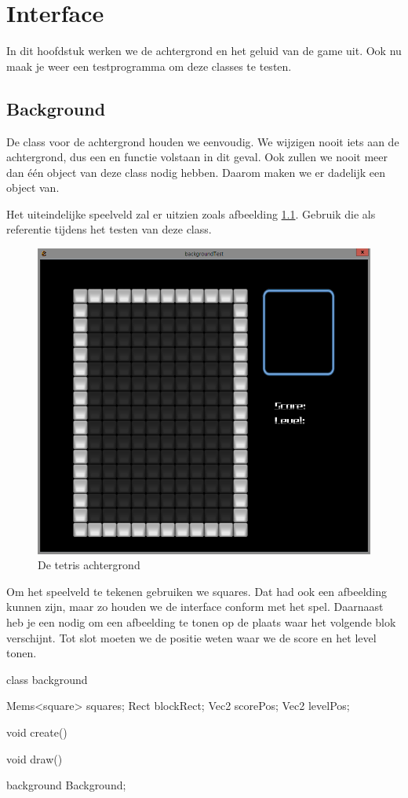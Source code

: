 \chapter{Interface}

In dit hoofdstuk werken we de achtergrond en het geluid van de game uit. Ook nu maak je weer een testprogramma om deze classes te testen.

\section{Background}
De class voor de achtergrond houden we eenvoudig. We wijzigen nooit iets aan de achtergrond, dus een  en  functie volstaan in dit geval. Ook zullen we nooit meer dan \'e\'en object van deze class nodig hebben. Daarom maken we er dadelijk een object van.

Het uiteindelijke speelveld zal er uitzien zoals afbeelding \ref{fig:tetris_background}. Gebruik die als referentie tijdens het testen van deze class.

\begin{figure}[ht]
\centering
\includegraphics[width=0.6\linewidth]{images/tetris_background.png}
\caption[]{De tetris achtergrond}
\label{fig:tetris_background}
\end{figure}

Om het speelveld te tekenen gebruiken we squares. Dat had ook een afbeelding kunnen zijn, maar zo houden we de interface conform met het spel. Daarnaast heb je een  nodig om een afbeelding te tonen op de plaats waar het volgende blok verschijnt. Tot slot moeten we de positie weten waar we de score en het level tonen.

\begin{code}
class background
{
   Mems<square> squares;
   Rect blockRect;
   Vec2 scorePos;
   Vec2 levelPos;
   
   void create()
   {
   }
   
   void draw()
   {
   }
}

background Background;
\end{code}

